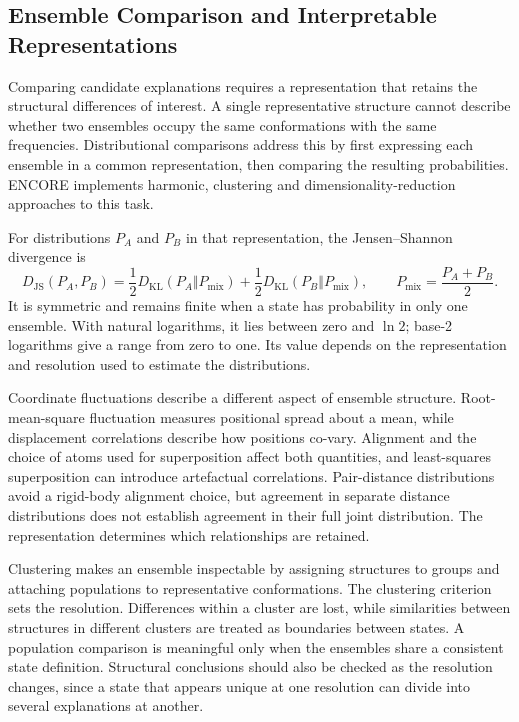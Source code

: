 \subsection{Ensemble Comparison and Interpretable Representations}
\label{sec:bg-ensemble-comparison}

Comparing candidate explanations requires a representation that retains the structural differences of interest. A single representative structure cannot describe whether two ensembles occupy the same conformations with the same frequencies. Distributional comparisons address this by first expressing each ensemble in a common representation, then comparing the resulting probabilities. ENCORE implements harmonic, clustering and dimensionality-reduction approaches to this task.\supercite{lindorff-larsenSimilarityMeasuresProtein2009,tibertiENCORESoftwareQuantitative2015}

For distributions $P_A$ and $P_B$ in that representation, the Jensen--Shannon divergence is
\begin{equation}
    D_{\text{JS}}(P_A,P_B)=
    \frac{1}{2}D_{\text{KL}}(P_A\Vert P_{\text{mix}})
    +\frac{1}{2}D_{\text{KL}}(P_B\Vert P_{\text{mix}}),
    \qquad P_{\text{mix}}=\frac{P_A+P_B}{2}.
    \label{eq:bg-jsd}
\end{equation}
It is symmetric and remains finite when a state has probability in only one ensemble. With natural logarithms, it lies between zero and $\ln2$; base-2 logarithms give a range from zero to one.\supercite{lindorff-larsenSimilarityMeasuresProtein2009,tibertiENCORESoftwareQuantitative2015} Its value depends on the representation and resolution used to estimate the distributions.

Coordinate fluctuations describe a different aspect of ensemble structure. Root-mean-square fluctuation measures positional spread about a mean, while displacement correlations describe how positions co-vary. Alignment and the choice of atoms used for superposition affect both quantities, and least-squares superposition can introduce artefactual correlations.\supercite{bmsb2012ch8} Pair-distance distributions avoid a rigid-body alignment choice, but agreement in separate distance distributions does not establish agreement in their full joint distribution. The representation determines which relationships are retained.

Clustering makes an ensemble inspectable by assigning structures to groups and attaching populations to representative conformations. The clustering criterion sets the resolution. Differences within a cluster are lost, while similarities between structures in different clusters are treated as boundaries between states.\supercite{lindorff-larsenSimilarityMeasuresProtein2009} A population comparison is meaningful only when the ensembles share a consistent state definition. Structural conclusions should also be checked as the resolution changes, since a state that appears unique at one resolution can divide into several explanations at another.

